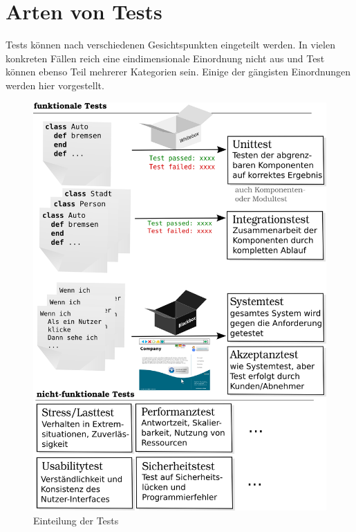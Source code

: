 
\section{Arten von Tests}
Tests können nach verschiedenen Gesichtspunkten eingeteilt werden. In vielen konkreten Fällen reich eine eindimensionale Einordnung nicht aus und Test können ebenso Teil mehrerer Kategorien sein. Einige der gängisten Einordnungen werden hier vorgestellt.
\begin{figure}[hp]
 \centering
 \includegraphics[width=\textwidth]{./diagrams/testarten.png}
 \caption{Einteilung der Tests}
 \label{fig:testArten}
\end{figure}

